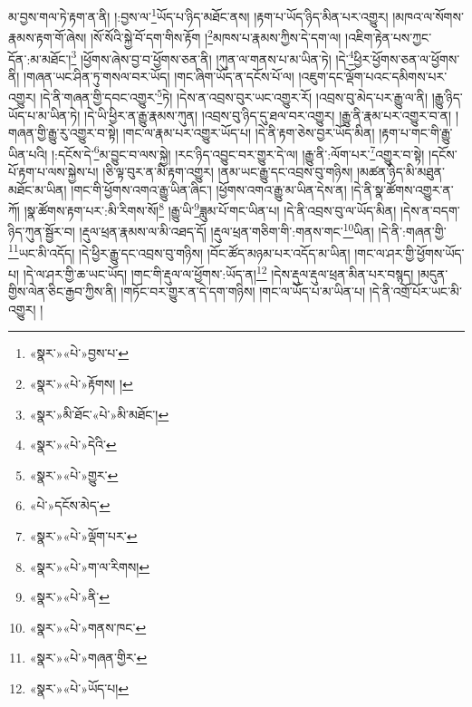 མ་བྱས་གལ་ཏེ་རྟག་ན་ནི། །:བྱས་ལ་\footnote{«སྣར་»«པེ་»བྱས་པ་}ཡོད་པ་ཉིད་མཐོང་ནས། །རྟག་པ་ཡོད་ཉིད་མིན་པར་འགྱུར། །མཁའ་ལ་སོགས་རྣམས་རྟག་གོ་ཞེས། །སོ་སོའི་སྐྱེ་བོ་དག་གིས་རྟོག །\footnote{«སྣར་»«པེ་»རྟོགས། །}མཁས་པ་རྣམས་ཀྱིས་དེ་དག་ལ། །འཇིག་རྟེན་པས་ཀྱང་དོན་:མ་མཐོང་།\footnote{«སྣར་»མི་ཐོང་«པེ་»མི་མཐོང་།} །ཕྱོགས་ཞེས་བྱ་བ་ཕྱོགས་ཅན་ནི། །ཀུན་ལ་གནས་པ་མ་ཡིན་ཏེ། །དེ་\footnote{«སྣར་»«པེ་»དེའི་}ཕྱིར་ཕྱོགས་ཅན་ལ་ཕྱོགས་ནི། །གཞན་ཡང་ཤིན་ཏུ་གསལ་བར་ཡོད། །གང་ཞིག་ཡོད་ན་དངོས་པོ་ལ། །འཇུག་དང་ལྡོག་པའང་དམིགས་པར་འགྱུར། །དེ་ནི་གཞན་གྱི་དབང་འགྱུར་\footnote{«སྣར་»«པེ་»གྱུར་}ཏེ། །དེས་ན་འབྲས་བུར་ཡང་འགྱུར་རོ། །འབྲས་བུ་མེད་པར་རྒྱུ་ལ་ནི། །རྒྱུ་ཉིད་ཡོད་པ་མ་ཡིན་ཏེ། །དེ་ཡི་ཕྱིར་ན་རྒྱུ་རྣམས་ཀུན། །འབྲས་བུ་ཉིད་དུ་ཐལ་བར་འགྱུར། །རྒྱུ་ནི་རྣམ་པར་འགྱུར་བ་ན། །གཞན་གྱི་རྒྱུ་རུ་འགྱུར་བ་སྟེ། །གང་ལ་རྣམ་པར་འགྱུར་ཡོད་པ། །དེ་ནི་རྟག་ཅེས་བྱར་ཡོད་མིན། །རྟག་པ་གང་གི་རྒྱུ་ཡིན་པའི། །:དངོས་དེ་\footnote{«པེ་»དངོས་མེད་}མ་བྱུང་བ་ལས་སྐྱེ། །རང་ཉིད་འབྱུང་བར་གྱུར་དེ་ལ། །རྒྱུ་ནི་:ལོག་པར་\footnote{«སྣར་»«པེ་»ལྡོག་པར་}འགྱུར་བ་སྟེ། །དངོས་པོ་རྟག་པ་ལས་སྐྱེས་པ། །ཅི་ལྟ་བུར་ན་མི་རྟག་འགྱུར། །ནམ་ཡང་རྒྱུ་དང་འབྲས་བུ་གཉིས། །མཚན་ཉིད་མི་མཐུན་མཐོང་མ་ཡིན། །གང་གི་ཕྱོགས་འགའ་རྒྱུ་ཡིན་ཞིང་། །ཕྱོགས་འགའ་རྒྱུ་མ་ཡིན་དེས་ན། །དེ་ནི་སྣ་ཚོགས་འགྱུར་ན་ཀོ། །སྣ་ཚོགས་རྟག་པར་:མི་རིགས་སོ།\footnote{«སྣར་»«པེ་»ག་ལ་རིགས།} །རྒྱུ་ཡི་\footnote{«སྣར་»«པེ་»ནི་}ཟླུམ་པོ་གང་ཡིན་པ། །དེ་ནི་འབྲས་བུ་ལ་ཡོད་མིན། །དེས་ན་བདག་ཉིད་ཀུན་སྦྱོར་བ། །རྡུལ་ཕྲན་རྣམས་ལ་མི་འཐད་དོ། །རྡུལ་ཕྲན་གཅིག་གི་:གནས་གང་\footnote{«སྣར་»«པེ་»གནས་ཁང་}ཡིན། །དེ་ནི་:གཞན་གྱི་\footnote{«སྣར་»«པེ་»གཞན་གྱིར་}ཡང་མི་འདོད། །དེ་ཕྱིར་རྒྱུ་དང་འབྲས་བུ་གཉིས། །བོང་ཚོད་མཉམ་པར་འདོད་མ་ཡིན། །གང་ལ་ཤར་གྱི་ཕྱོགས་ཡོད་པ། །དེ་ལ་ཤར་གྱི་ཆ་ཡང་ཡོད། །གང་གི་རྡུལ་ལ་ཕྱོགས་:ཡོད་ན།\footnote{«སྣར་»«པེ་»ཡོད་པ།} །དེས་རྡུལ་རྡུལ་ཕྲན་མིན་པར་བསྙད། །མདུན་གྱིས་ལེན་ཅིང་རྒྱབ་ཀྱིས་ནི། །གཏོང་བར་གྱུར་ན་དེ་དག་གཉིས། །གང་ལ་ཡོད་པ་མ་ཡིན་པ། །དེ་ནི་འགྲོ་པོར་ཡང་མི་འགྱུར། །
